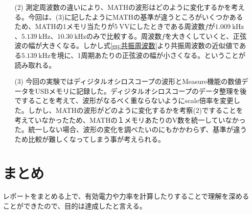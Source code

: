 \documentclass[10pt,a4paper]{jsarticle}
\numberwithin{equation}{section}
\numberwithin{figure}{section}
\numberwithin{table}{section}
\begin{document}
\begin{itemize}
    \item [(2)]測定周波数の違いにより、MATHの波形はどのように変化するかを考える。今回は、(3)に記したようにMATHの基準が違うところがいくつかあるため、MATHの1メモリ当たりが$\SI{5}{\volt\volt}$にしたときである周波数$f$が$\SI{1.009}{\kilo\hertz}$、$\SI{5.139}{\kilo\hertz}$、$\SI{10.30}{\kilo\hertz}$のみで比較する。周波数$f$を大きくしていくと、正弦波の幅が大きくなる。しかし式\ref{eq:共振周波数}より共振周波数の近似値である$\SI{5.139}{\kilo\hertz}$を境に、1周期あたりの正弦波の幅が小さくなる。ということが読み取れる。
    \item[(3)]今回の実験ではディジタルオシロスコープの波形とMeasure機能の数値データをUSBメモリに記録した。ディジタルオシロスコープのデータ整理を後ですることを考えて、波形がなるべく重ならないようにscale倍率を変更した。しかし、MATHの波形がどのように変化するかを考察(2)ですることを考えていなかったため、MATHの１メモリあたりの$\si{\volt}$数を統一していなかった。統一しない場合、波形の変化を調べたいのにもかかわらず、基準が違うため比較が難しくなってしまう事が考えられる。
\end{itemize}
\section{まとめ}
  レポートをまとめる上で、有効電力や力率を計算したりすることで理解を深めることができたので、目的は達成したと言える。
\end{document}
